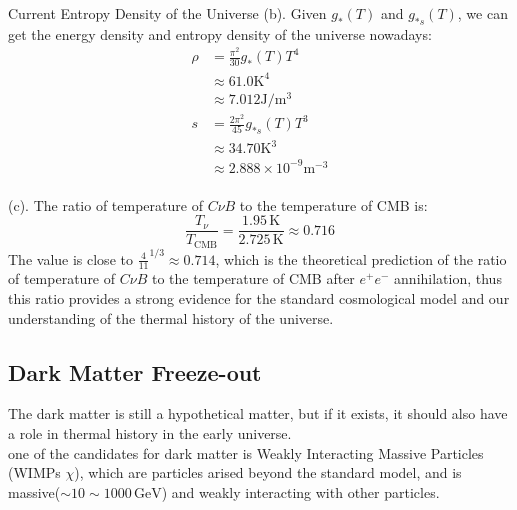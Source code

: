 \begin{example}{Current Entropy Density of the Universe}{}
    (b). Given $g_*(T)$ and $g_{*s}(T)$, we can get the energy density and entropy density of the universe nowadays:
    \begin{align*}
        \rho &= \frac{\pi^2}{30} g_*(T) T^4 \\
        &\approx 61.0 \mathrm{K^4} \\
        &\approx 7.012 \mathrm{J/m^3} \\
        s &= \frac{2\pi^2}{45} g_{*s}(T) T^3 \\
        &\approx 34.70 \mathrm{K^3} \\
        &\approx 2.888 \times 10^{-9} \mathrm{m^{-3}}
    \end{align*} \\

    (c). The ratio of temperature of $C \nu B$ to the temperature of CMB is:
    \[
        \frac{T_\nu}{T_\text{CMB}} = \frac{1.95\,\mathrm{K}}{2.725\,\mathrm{K}} \approx 0.716
    \]
    The value is close to $\frac{4}{11}^{1/3} \approx 0.714$, which is the theoretical prediction of the ratio of temperature of $C \nu B$ to the temperature of CMB after $e^+ e^-$ annihilation, thus this ratio provides a strong evidence for the standard cosmological model and our understanding of the thermal history of the universe. \\
\end{example}



\bigskip\noindent \bigskip\noindent  \bigskip\noindent 
\subsection{Dark Matter Freeze-out}
The dark matter is still a hypothetical matter, but if it exists, it should also have a role in thermal history in the early universe. \\

one of the candidates for dark matter is Weakly Interacting Massive Particles (WIMPs $\chi$), which are particles arised beyond the standard model, and is massive($\sim 10 \sim 1000\,\mathrm{GeV}$) and weakly interacting with other particles. \\

